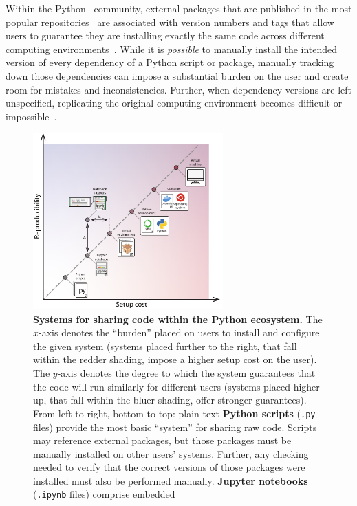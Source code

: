 \documentclass[preprint,12pt,a4paper]{elsarticle}
\begin{document}
Within the Python~\cite{vanR95} community, external packages that are
published in the most popular repositories~\cite{Pyth03, cond15} are
associated with version numbers and tags that allow users to guarantee
they are installing exactly the same code across different computing
environments~\cite{CoghStuf13}.  While it is \textit{possible} to
manually install the intended version of every dependency of a Python
script or package, manually tracking down those dependencies can
impose a substantial burden on the user and create room for mistakes
and inconsistencies. Further, when dependency versions are left
unspecified, replicating the original computing environment becomes
difficult or impossible~\citep{PimeEtal19}.

\begin{figure}[tp]
\centering
\includegraphics[width=0.65\textwidth]{figs/shareable_code_2d}
\caption{\small \textbf{Systems for sharing code within the Python
  ecosystem.} The $x$-axis denotes the ``burden'' placed on users to
  install and configure the given system (systems placed further to the right, that fall within the redder shading, impose a higher setup cost on the user).  The $y$-axis denotes the
  degree to which the system guarantees that the code will run
  similarly for different users (systems placed higher up, that fall within the bluer shading, offer stronger guarantees).
  From left to right, bottom to top: plain-text \textbf{Python
  scripts} (\texttt{.py} files) provide the most basic ``system''
  for sharing raw code.  Scripts may reference external packages, but
  those packages must be manually installed on other users' systems.
  Further, any checking needed to verify that the correct versions of
  those packages were installed must also be performed manually.
  \textbf{Jupyter notebooks} (\texttt{.ipynb} files) comprise embedded
}
\end{figure}
\end{document}
